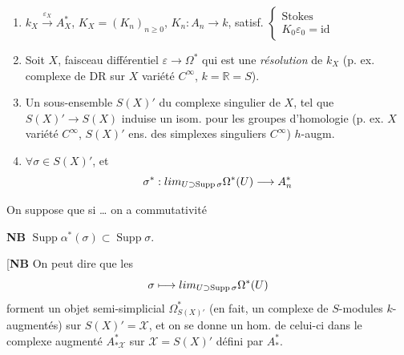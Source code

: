 \documentclass[11pt,a4paper]{article}
\begin{document}
\begin{enumerate}
  \item[(1)] $k_X \xrightarrow{\varepsilon_X} A^*_X$, \quad $K_X = (K_n)_{n \geq 0}$,
  \quad $K_n : A_n \to k$, satisf.
  $\left\{\begin{array}{l} \text{Stokes} \\ K_0 \varepsilon_0 = \mathrm{id} \end{array}\right.$
  \item[(2)] Soit \struck{\ill{}}  $X$, \add{\ill{}}
  faisceau différentiel $\varepsilon \to \Omega^*$ qui est une \emph{résolution} de $k_X$
  (p. ex. complexe de DR sur $X$ variété $C^{\infty}$, $k = \mathbb{R} = S$).
  \item[(3)] Un sous-ensemble $S(X)'$ du complexe singulier de $X$, tel que
  $S(X)' \to S(X)$ \struck{\ill{}} induise un isom. pour les groupes d'homologie
   (p. ex. $X$ variété $C^{\infty}$, $S(X)'$ ens. des simplexes singuliers
  $C^{\infty}$)  \ill{}
  \struck{\ill{}} \ill{} $h$-augm.
  \item[(4)] $\forall \sigma \in S(X)'$, et \ill{}
  \[
    \sigma^* : \varinjlim_{U \supset \operatorname{Supp}\sigma} \Omega^*(U) \longrightarrow A^*_n
  \]
\end{enumerate}

On suppose que si \ldots{} on a commutativité


\textbf{NB} $\operatorname{Supp}\alpha^*(\sigma) \subset \operatorname{Supp}\sigma$.

[\textbf{NB} On peut dire que les
\[
  \sigma \longmapsto \varinjlim_{U \supset \operatorname{Supp}\sigma} \Omega^*(U)
\]
forment un \struck{\ill{}} objet semi-simplicial $\Omega^*_{S(X)'}$ (en fait, un complexe
de $S$-modules $k$-augmentés) sur $S(X)' = \mathcal{X}$, et on se donne un hom. de
celui-ci dans le complexe augmenté $A^*_{*\mathcal{X}}$ sur $\mathcal{X} = S(X)'$ défini
par $A^*_{*}$.
\end{document}

